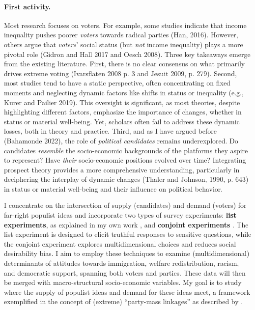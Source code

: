 \documentclass[letterpaper]{article}
\begin{document}
\paragraph{First activity.} Most research focuses on voters. For example, some studies indicate that income inequality pushes poorer \emph{voters} towards radical parties (Han, 2016). However, others argue that \emph{voters}' social status (but \emph{not} income inequality) plays a more pivotal role (Gidron and Hall 2017 and Oesch 2008). Three key takeaways emerge from the existing literature. First, there is no clear consensus on what primarily drives extreme voting (Ivarsflaten 2008 p. 3 and Jesuit 2009, p. 279). Second, most studies tend to have a static perspective, often concentrating on fixed moments and neglecting dynamic factors like shifts in status or inequality (e.g., Kurer and Pailier 2019). This oversight is significant, as most theories, despite highlighting different factors, emphasize the importance of changes, whether in status or material well-being. Yet, scholars often fail to address these dynamic losses, both in theory and practice. Third, and as I have argued before (Bahamonde 2022), the role of \emph{political candidates} remains underexplored. Do candidates \emph{resemble} the socio-economic backgrounds of the platforms they aspire to represent? Have \emph{their} socio-economic positions evolved over time? Integrating prospect theory provides a more comprehensive understanding, particularly in deciphering the interplay of dynamic changes (Thaler and Johnson, 1990, p. 643) in status or material well-being and their influence on political behavior.

\vspace{2mm}I concentrate on the intersection of supply (candidates) and demand (voters) for far-right populist ideas and incorporate two types of survey experiments: {\bf list experiments}, as explained in my own work \parencite{Bahamonde2020a}, and {\bf conjoint experiments} \parencite{Hainmueller2014}. The list experiment is designed to elicit truthful responses to sensitive questions, while the conjoint experiment explores multidimensional choices and reduces social desirability bias. I aim to employ these techniques to examine (multidimensional) determinants of attitudes towards immigration, welfare redistribution, racism, and democratic support, spanning both voters and parties. These data will then be merged with macro-structural socio-economic variables. My goal is to study where the supply of populist ideas and demand for these ideas meet, a framework exemplified in the concept of (extreme) ``party-mass linkages'' as described by \textcite{Kitschelt2000}. 
\end{document}
